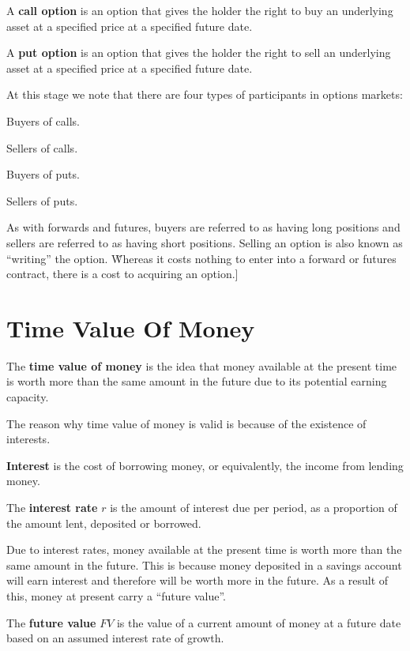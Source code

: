 A \textbf{call option} is an option that gives the holder the right to buy an underlying asset at a specified price
at a specified future date.
\ed

A \textbf{put option} is an option that gives the holder the right to sell an underlying asset at a specified price
at a specified future date.
\ed

At this stage we note that there are four types of participants in options markets:
\bit
\item Buyers of calls.
\item Sellers of calls.
\item Buyers of puts.
\item Sellers of puts.
\eit

As with forwards and futures, buyers are referred to as having long positions and sellers are referred to as having
short positions. Selling an option is also known as ``writing'' the option. \v

Whereas it costs nothing to enter into a forward or futures contract, there is a cost to acquiring an option.]

\section{Time Value Of Money}

The \textbf{time value of money} is the idea that money available at the present time is worth more than the same
amount in the future due to its potential earning capacity.
\ed

The reason why time value of money is valid is because of the existence of interests.

\bd[Interest]
\textbf{Interest} is the cost of borrowing money, or equivalently, the income from lending money.
\ed

The \textbf{interest rate} $r$ is the amount of interest due per period, as a proportion of the amount lent, deposited
or borrowed.
\ed

Due to interest rates, money available at the present time is worth more than the same amount in the future. This is
because money deposited in a savings account will earn interest and therefore will be worth more in the future. As a
result of this, money at present carry a ``future value''.

The \textbf{future value} $FV$ is the value of a current amount of money at a future date based on an assumed interest
rate of growth.
\ed

